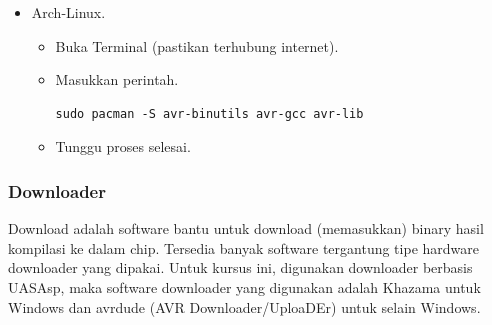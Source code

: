 \documentclass[12pt,]{article}
\begin{document}
\begin{itemize}
		\item Arch-Linux.
		\begin{itemize}
			\item Buka Terminal (pastikan terhubung internet).
			\item Masukkan perintah.
			\begin{verbatim}
sudo pacman -S avr-binutils avr-gcc avr-lib 
			\end{verbatim}
			\item Tunggu proses selesai.
		\end{itemize}
			
	\end{itemize}

	\subsubsection{Downloader}
	Download adalah software bantu untuk download (memasukkan) binary hasil kompilasi ke dalam chip.
	Tersedia banyak software tergantung tipe hardware downloader yang dipakai.
	Untuk kursus ini, digunakan downloader berbasis UASAsp, maka software downloader yang digunakan adalah
	Khazama untuk Windows dan avrdude (AVR Downloader/UploaDEr) untuk selain Windows.
	
\end{document}
